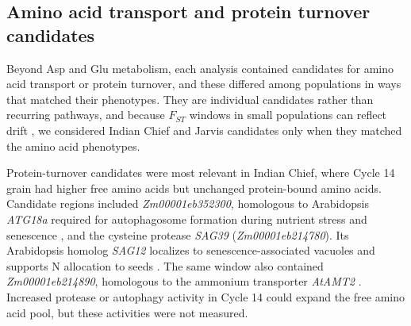 \documentclass[namedate,unnumsec,webpdf,contemporary,large]{oup-authoring-template}
\begin{document}
\subsection{Amino acid transport and protein turnover candidates}

Beyond Asp and Glu metabolism, each analysis contained candidates for amino acid transport or protein turnover, and these differed among populations in ways that matched their phenotypes. They are individual candidates rather than recurring pathways, and because $F_{ST}$ windows in small populations can reflect drift \citep{Gerke2015DriftRRS}, we considered Indian Chief and Jarvis candidates only when they matched the amino acid phenotypes.

Protein-turnover candidates were most relevant in Indian Chief, where Cycle 14 grain had higher free amino acids but unchanged protein-bound amino acids. Candidate regions included \textit{Zm00001eb352300}, homologous to Arabidopsis \textit{ATG18a} required for autophagosome formation during nutrient stress and senescence \citep{Xiong2005ATG18a}, and the cysteine protease \textit{SAG39} (\textit{Zm00001eb214780}). Its Arabidopsis homolog \textit{SAG12} localizes to senescence-associated vacuoles \citep{Otegui2005SAV} and supports N allocation to seeds \citep{James2018SAG12}. The same window also contained \textit{Zm00001eb214890}, homologous to the ammonium transporter \textit{AtAMT2} \citep{Neuhaeuser2009AtAMT2}. Increased protease or autophagy activity in Cycle 14 could expand the free amino acid pool, but these activities were not measured.
\end{document}
